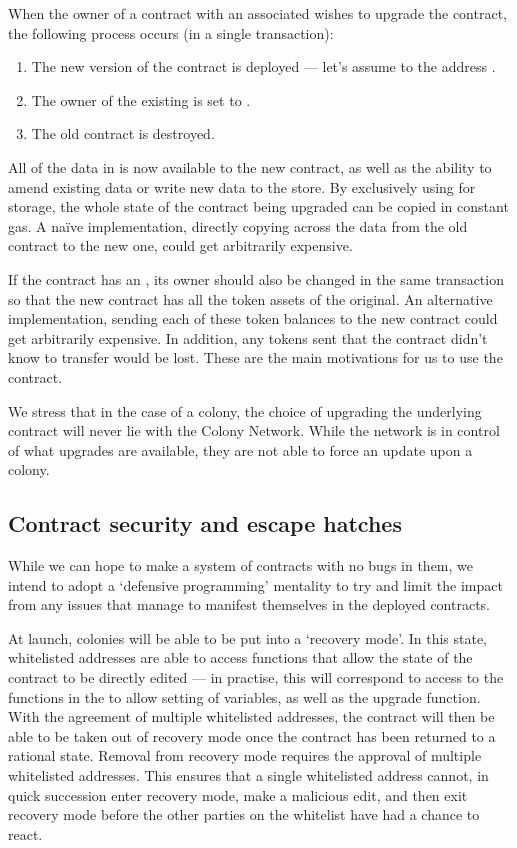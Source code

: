 When the owner of a contract with an associated  wishes to upgrade the contract, the following process occurs (in a single transaction):

\begin{enumerate}
\item The new version of the contract is deployed --- let's assume to the address .
\item The owner of the existing  is set to .
\item The old contract is destroyed.
\end{enumerate}

All of the data in  is now available to the new contract, as well as the ability to amend existing data or write new data to the store. By exclusively using  for storage, the whole state of the contract being upgraded can be copied in constant gas. A na{\"i}ve implementation, directly copying across the data from the old contract to the new one, could get arbitrarily expensive.

If the contract has an , its owner should also be changed in the same transaction so that the new contract has all the token assets of the original. An alternative implementation, sending each of these token balances to the new contract could get arbitrarily expensive. In addition, any tokens sent that the contract didn't know to transfer would be lost. These are the main motivations for us to use the  contract.

We stress that in the case of a colony, the choice of upgrading the underlying  contract will never lie with the Colony Network. While the network is in control of what upgrades are available, they are not able to force an update upon a colony.


\subsection{Contract security and escape hatches}\label{sec:escape-hatches}
While we can hope to make a system of contracts with no bugs in them, we intend to adopt a `defensive programming' mentality to try and limit the impact from any issues that manage to manifest themselves in the deployed contracts.

At launch, colonies will be able to be put into a `recovery mode'. In this state, whitelisted addresses are able to access functions that allow the state of the contract to be directly edited --- in practise, this will correspond to access to the functions in the  to allow setting of variables, as well as the upgrade function. With the agreement of multiple whitelisted addresses, the contract will then be able to be taken out of recovery mode once the contract has been returned to a rational state. Removal from recovery mode requires the approval of multiple whitelisted addresses. This ensures that a single whitelisted address cannot, in quick succession enter recovery mode, make a malicious edit, and then exit recovery mode before the other parties on the whitelist have had a chance to react.


